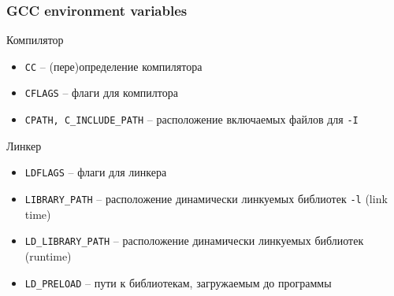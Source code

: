 \begin{frame}[fragile]
	\frametitle{GCC environment variables}

	\begin{block}{Компилятор}
		\begin{itemize}
			\item {\tt CC} -- (пере)определение компилятора
			\item {\tt CFLAGS} -- флаги для компилтора
			\item {\tt CPATH, C\_INCLUDE\_PATH} -- расположение включаемых файлов для {\tt -I}
		\end{itemize}
	\end{block}

	\begin{block}{Линкер}
		\begin{itemize}
			\item {\tt LDFLAGS} -- флаги для линкера
			\item {\tt LIBRARY\_PATH} -- расположение динамически линкуемых библиотек {\tt -l} (link time)
			\item {\tt LD\_LIBRARY\_PATH} -- расположение динамически линкуемых библиотек (runtime)
			\item {\tt LD\_PRELOAD} -- пути к библиотекам, загружаемым до программы
		\end{itemize}
	\end{block}

\end{frame}



